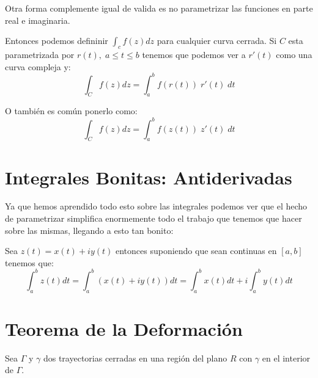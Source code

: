 \documentclass[12pt, fleqn]{report}                             %
\theoremstyle{break}                                            %
\begin{document}
                Otra forma complemente igual de valida es no parametrizar las funciones
                en parte real e imaginaria.

                Entonces podemos defininir $\int_c f(z)dz$ para cualquier curva
                cerrada. Si $C$ esta parametrizada por $r(t), \; a \leq t \leq b$
                tenemos que podemos ver a $r'(t)$ como una curva compleja y:
                \begin{equation*}
                    \int_C f(z) dz = \int_a^b f(r(t)) \; r'(t) \; dt
                \end{equation*}

                O también es común ponerlo como:
                \begin{equation*}
                    \int_C f(z) dz = \int_a^b f(z(t)) \; z'(t) \; dt
                \end{equation*}


        \section{Integrales Bonitas: Antiderivadas}

            Ya que hemos aprendido todo esto sobre las integrales podemos ver que el hecho
            de parametrizar simplifica enormemente todo el trabajo que tenemos que hacer sobre
            las mismas, llegando a esto tan bonito:

            Sea $z(t) = x(t) + iy(t)$ entonces suponiendo que sean continuas en $[a,b]$
            tenemos que:
            \begin{equation*}
                \int_a^b z(t) dt 
                    = \int_a^b (x(t) + iy(t))dt
                    = \int_a^b x(t)dt + i\int_a^b y(t)dt
            \end{equation*}



        \section{Teorema de la Deformación}

            Sea $\Gamma$ y $\gamma$ dos trayectorias cerradas en una región del plano $R$
            con $\gamma$ en el interior de $\Gamma$.
\end{document}
